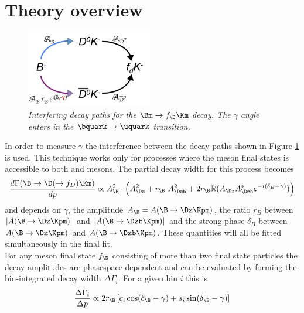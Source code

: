 \section{Theory overview}
\begin{figure}[!h]
\vspace*{-0.cm}
  \begin{center}
 \includegraphics[width=0.49\textwidth]{interfere.png}
  \vspace*{-0.5cm}
  \end{center}
  \caption{\textit{Interfering decay paths for the $\Bm \rightarrow f_{\D} \Km $ decay. The $\gamma$ angle enters in the $\bquark \rightarrow \uquark $ transition.}}
  \label{fig:amp}
\end{figure}
In order to measure $\gamma$ the interference between the decay paths shown in Figure \ref{fig:amp} is used. This technique works only for processes where the \D meson final states is accessible to both \Dz and \Dzb mesons. The partial decay width for this process becomes
\begin{equation}
\frac{d\Gamma(\B \rightarrow \D(\rightarrow f_D) \Km)}{dp} \propto A_{\B}^2 \cdot \left(  A^2_{\Dz}  + r_{\B}\ A^2_{\Dzb} + 2 r_{\B} \mathbb{R} (A_{\Dz} A^*_{\Dzb} e^{-i(\delta_B-\gamma)}) \right )
\end{equation}
and depends on $\gamma$, the amplitude $A_{\B} = A(\B \rightarrow \Dz \Kpm)$, the ratio $r_B$ between $|A(\B \rightarrow \Dz \Kpm)|$ and $|A(\B \rightarrow \Dzb \Kpm)|$ and the strong phase $\delta_B$ between $A(\B \rightarrow \Dz \Kpm)$ and $A(\B \rightarrow \Dzb \Kpm)$. These quantities will all be fitted simultaneously in the final fit.\\
For any \D meson final state $f_{\D}$ consisting of more than two final state particles the \D decay amplitudes are phasespace dependent and can be evaluated by forming the bin-integrated decay width $\Delta \Gamma_i$. For a given bin $i$ this is
\begin{equation}
\frac{\Delta \Gamma_i}{\Delta p} \propto  2 r_{\B} \left [ c_i \cos(\delta_{\B} - \gamma) + s_i \sin(\delta_{\B} - \gamma) \right ]
\end{equation}
